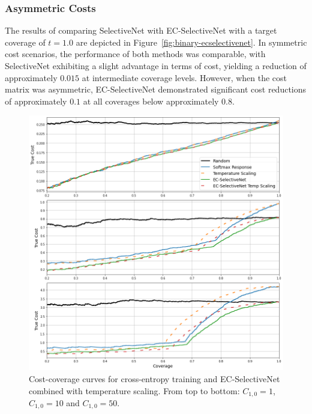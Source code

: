 \subsubsection{Asymmetric Costs}
The results of comparing SelectiveNet with EC-SelectiveNet with a target coverage of $t=1.0$ are depicted in Figure~\ref{fig:binary-ecselectivenet}. In symmetric cost scenarios, the performance of both methods was comparable, with SelectiveNet exhibiting a slight advantage in terms of cost, yielding a reduction of approximately $0.015$ at intermediate coverage levels. However, when the cost matrix was asymmetric, EC-SelectiveNet demonstrated significant cost reductions of approximately $0.1$ at all coverages below approximately $0.8$.

\begin{figure}[!h]
	\centering
	\includegraphics[width=\textwidth]{images/binary_asymetrical.png}
	\caption{Cost-coverage curves for cross-entropy training and EC-SelectiveNet combined with temperature scaling. From top to bottom: $C_{1,0}=1$, $C_{1,0}=10$ and $C_{1,0}=50$.}
	\label{fig:binary-asymetric}
\end{figure}


